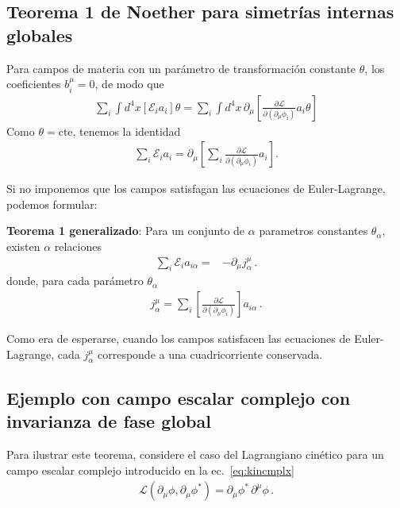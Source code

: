 \subsection{Teorema 1 de Noether para simetrías internas globales}
\begin{frame}
Para campos de materia con un parámetro de transformación constante $\theta$, los coeficientes $b_i^{\mu}=0$, de modo que
\begin{align}
 \sum_i\int {d^4}x \left[ \mathcal{E}_ia_i  \right]  \theta   =  \sum_i \int {d^4}x\, \partial_{\mu} \left[ \frac{\partial\mathcal{L}}{\partial(\partial_{\mu}\phi_i)} a_i \theta  \right]
\end{align}
Como $\theta=\text{cte}$, tenemos la identidad
\begin{align}
  \sum_i\mathcal{E}_ia_i    =  \partial_{\mu} \left[  \sum_i\frac{\partial\mathcal{L}}{\partial(\partial_{\mu}\phi_i)}a_i\right].
\end{align}


Si no imponemos que los campos satisfagan las ecuaciones de Euler-Lagrange, podemos formular:

\textbf{Teorema 1 generalizado}: Para un conjunto de $\alpha$ parametros constantes $\theta_{\alpha}$, existen $\alpha$ relaciones
\begin{align}
     \sum_i \mathcal{E}_ia_{i\alpha}     
 =&-  \partial_{\mu} j^{\mu}_{\alpha}\,.
\end{align}
donde, para cada parámetro $\theta_{\alpha}$
\begin{align}
  \label{eq:t1gen}
  j^\mu_{\alpha}=\sum_i\left[ \frac{\partial\mathcal{L}}{\partial(\partial_{\mu}\phi_i)}\right] a_{i\alpha}\,.
\end{align}
\end{frame}

Como era de esperarse, cuando los campos satisfacen las ecuaciones de Euler-Lagrange, cada  $j^{\mu}_{\alpha}$ corresponde a una cuadricorriente conservada.

\subsection{Ejemplo con campo escalar complejo con invarianza de fase global}
Para ilustrar este teorema, considere el caso del Lagrangiano cinético para un campo escalar complejo introducido en la ec.~\eqref{eq:kincmplx}
\begin{align}
  \mathcal{L}(\partial_{\mu} \phi,\partial_{\mu} \phi^{*})=  {\partial_\mu\phi^{*}}\,{\partial^\mu\phi}\,.
\end{align}

